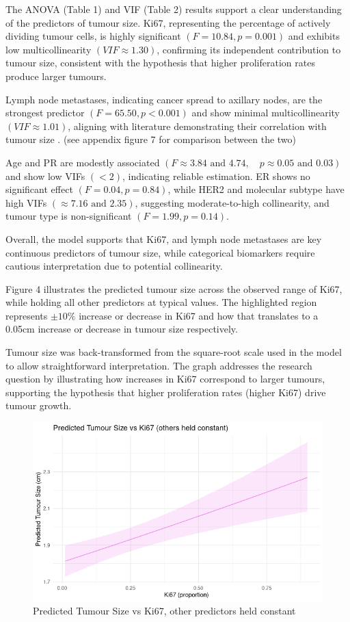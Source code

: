 \documentclass[letter]{article}
\begin{document}
The ANOVA (Table 1) and VIF (Table 2) results support a clear understanding of the predictors of tumour size. Ki67, representing the percentage of actively dividing tumour cells, is highly significant 
$(F = 10.84, p = 0.001)$ and exhibits low multicollinearity $(VIF \approx 1.30)$, confirming its independent contribution to tumour size, consistent with the hypothesis that higher proliferation rates produce larger tumours. 

Lymph node metastases, indicating cancer spread to axillary nodes, are the strongest predictor $(F = 65.50, p < 0.001)$ and show minimal multicollinearity $(VIF \approx 1.01)$, aligning with literature demonstrating their correlation with tumour size \cite{Min2021}.
(see appendix figure 7 for comparison between the two)

Age and PR are modestly associated $(F \approx 3.84 \text{ and } 4.74, \quad p \approx 0.05 \text{ and } 0.03)$ and show low VIFs $(<2)$, indicating reliable estimation. 
ER shows no significant effect $(F = 0.04, p = 0.84)$, while HER2 and molecular subtype have high VIFs $(\approx 7.16 \text{ and } 2.35)$, suggesting moderate-to-high collinearity, and tumour type is non-significant $(F = 1.99, p = 0.14)$.

Overall, the model supports that Ki67, and lymph node metastases are key continuous predictors of tumour size, while categorical biomarkers require cautious interpretation due to potential collinearity.

\newpage

Figure 4 illustrates the predicted tumour size across the observed range of Ki67, while holding all other predictors at typical values. The highlighted region represents $\pm 10\%$ increase or decrease in Ki67 and how that translates to a 0.05cm increase or decrease in tumour size respectively.

Tumour size was back-transformed from the square-root scale used in the model to allow straightforward interpretation. 
The graph addresses the research question by illustrating how increases in Ki67 correspond to larger tumours, supporting the hypothesis that higher proliferation rates (higher Ki67) drive tumour growth.


\begin{figure}[hbt!]
        \centering
        \includegraphics[width=\textwidth]{PTS_K.png}
        \caption{Predicted Tumour Size vs Ki67, other predictors held constant}
\end{figure}
\newpage
\end{document}
